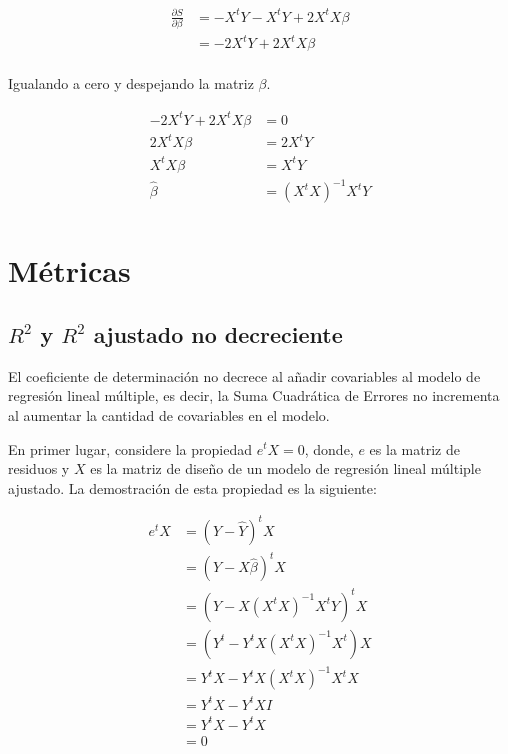 \documentclass[
  11pt,
]{book}
\theoremstyle{definition}
\theoremstyle{definition}
\theoremstyle{definition}
\theoremstyle{definition}
\theoremstyle{remark}
\begin{document}
\begin{equation}
\begin{split}
\frac{\partial S}{\partial \beta} &= - X^tY - X^tY + 2X^tX\beta\\
&= - 2X^tY + 2X^tX\beta\\
\end{split}
\label{eq:betasmultiple2-demostracion}
\end{equation}

Igualando a cero y despejando la matriz \(\beta\).

\begin{equation}
\begin{split}
- 2X^tY + 2X^tX\beta &= 0\\
2X^tX\beta &= 2X^tY\\
X^tX\beta &= X^tY\\
\widehat{\beta} &= (X^tX)^{-1}X^tY\\
\end{split}
\label{eq:betasmultiple3-demostracion}
\end{equation}

\chapter{Métricas}\label{muxe9tricas}

\section{\texorpdfstring{\(R^2\) y \(R^2\) ajustado no decreciente}{R\^{}2 y R\^{}2 ajustado no decreciente}}\label{R2-no-decreciente}

El coeficiente de determinación no decrece al añadir covariables al modelo de regresión lineal múltiple, es decir, la Suma Cuadrática de Errores no incrementa al aumentar la cantidad de covariables en el modelo.

En primer lugar, considere la propiedad \(e^tX = 0\), donde, \(e\) es la matriz de residuos y \(X\) es la matriz de diseño de un modelo de regresión lineal múltiple ajustado. La demostración de esta propiedad es la siguiente:

\begin{equation}
\begin{split}
e^tX &= (Y - \widehat{Y})^tX\\
&= (Y - X\widehat{\beta})^tX\\
&= (Y - X(X^tX)^{-1}X^tY)^tX\\
&= (Y^t - Y^tX(X^tX)^{-1}X^t)X\\
&= Y^tX - Y^tX(X^tX)^{-1}X^tX\\
&= Y^tX - Y^tXI\\
&= Y^tX - Y^tX\\
&= 0\\
\end{split}
\label{eq:propiedad-residuos}
\end{equation}
\end{document}
